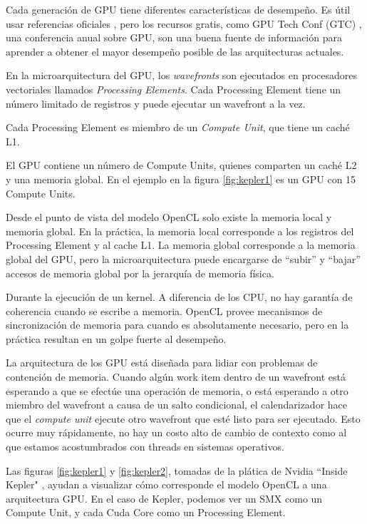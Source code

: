 Cada generación de GPU tiene diferentes características de desempeño. Es útil
usar referencias oficiales \cite{maxwell-tuning}, pero los recursos gratis,
como GPU Tech Conf (GTC) \cite{gtc}, una conferencia anual sobre GPU, son una
buena fuente de información para aprender a obtener el mayor desempeño posible
de las arquitecturas actuales.

En la microarquitectura del GPU, los \emph{wavefronts} son ejecutados en
procesadores vectoriales llamados \emph{Processing Elements}. Cada Processing
Element tiene un número limitado de registros y puede ejecutar un wavefront a la vez.

Cada Processing Element es miembro de un \emph{Compute Unit}, que tiene un caché L1.

El GPU contiene un número de Compute Units, quienes comparten un caché L2 y una
memoria global. En el ejemplo en la figura \ref{fig:kepler1} es un GPU con 15
Compute Units.

Desde el punto de vista del modelo OpenCL solo existe la memoria local y
memoria global. En la práctica, la memoria local corresponde a los registros
del Processing Element y al cache L1. La memoria global corresponde a la
memoria global del GPU, pero la microarquitectura puede encargarse de ``subir''
y ``bajar''  accesos de memoria global por la jerarquía de memoria física.

Durante la ejecución de un kernel. A diferencia de los CPU, no hay garantía de
coherencia cuando se escribe a memoria. OpenCL provee mecanismos de
sincronización de memoria para cuando es absolutamente necesario, pero en la
práctica resultan en un golpe fuerte al desempeño.

La arquitectura de los GPU está diseñada para lidiar con problemas de
contención de memoria. Cuando algún work item dentro de un wavefront está
esperando a que se efectúe una operación de memoria, o está esperando a otro
miembro del wavefront a causa de un salto condicional, el calendarizador hace
que el \emph{compute unit} ejecute otro wavefront que esté listo para ser
ejecutado. Esto ocurre muy rápidamente, no hay un costo alto de cambio de
contexto como al que estamos acostumbrados con threads en sistemas operativos.

Las figuras \ref{fig:kepler1} y \ref{fig:kepler2}, tomadas de la plática de
Nvidia ``Inside Kepler" \cite{kepler-slides}, ayudan a visualizar cómo
corresponde el modelo OpenCL a una arquitectura GPU. En el caso de Kepler,
podemos ver un SMX como un Compute Unit, y cada Cuda Core como un Processing
Element.

